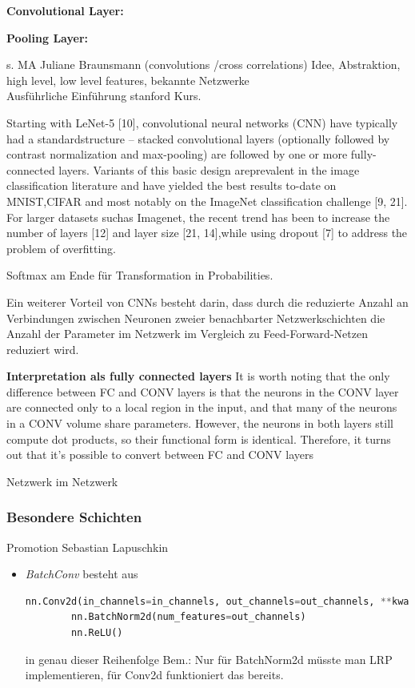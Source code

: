 \documentclass[11pt,a4paper]{article}
\numberwithin{equation}{section}
\begin{document}
	\noindent\textbf{Convolutional Layer:}
	
	
	\noindent\textbf{Pooling Layer:}
	
	s. MA Juliane Braunsmann (convolutions /cross correlations)
	Idee, Abstraktion, high level, low level features, bekannte Netzwerke\\
	
	Ausführliche Einführung stanford Kurs\cite{cnn_stanford}. 
	
	
	Starting with LeNet-5   [10], convolutional neural networks (CNN) have typically had a standardstructure – stacked convolutional layers (optionally followed by contrast normalization and max-pooling)  are  followed  by  one  or  more  fully-connected  layers.   Variants  of  this  basic  design  areprevalent in the image classification literature and have yielded the best results to-date on MNIST,CIFAR and most notably on the ImageNet classification challenge [9, 21].  For larger datasets suchas Imagenet, the recent trend has been to increase the number of layers  [12] and layer size [21, 14],while using dropout [7] to address the problem of overfitting.\cite{goingdeeperwithconvolutions}
	
	Softmax am Ende für Transformation in Probabilities.
	
	Ein weiterer Vorteil von CNNs besteht darin, dass durch die reduzierte Anzahl an Verbindungen zwischen Neuronen zweier benachbarter Netzwerkschichten die Anzahl der Parameter im Netzwerk im Vergleich zu Feed-Forward-Netzen reduziert wird.
	
	\noindent \textbf{Interpretation als fully connected layers}
	It is worth noting that the only difference between FC and CONV layers is that the neurons in the CONV layer are connected only to a local region in the input, and that many of the neurons in a CONV volume share parameters. However, the neurons in both layers still compute dot products, so their functional form is identical. Therefore, it turns out that it’s possible to convert between FC and CONV layers
	
	Netzwerk im Netzwerk \cite{cnn_architectures_stanford, goingdeeperwithconvolutions}
	
	\subsubsection{Besondere Schichten}
	Promotion Sebastian Lapuschkin
	
	\begin{itemize}
		\item \textit{BatchConv} besteht aus 
		\begin{lstlisting}[language=Python, caption=python-interner Aufbau einer BatchConv Schicht
		]
		nn.Conv2d(in_channels=in_channels, out_channels=out_channels, **kwargs)
		nn.BatchNorm2d(num_features=out_channels)
		nn.ReLU()
		\end{lstlisting}
		in genau dieser Reihenfolge
		Bem.: Nur für BatchNorm2d müsste man LRP implementieren, für Conv2d funktioniert das bereits.
	\end{itemize}
	
\end{document}
